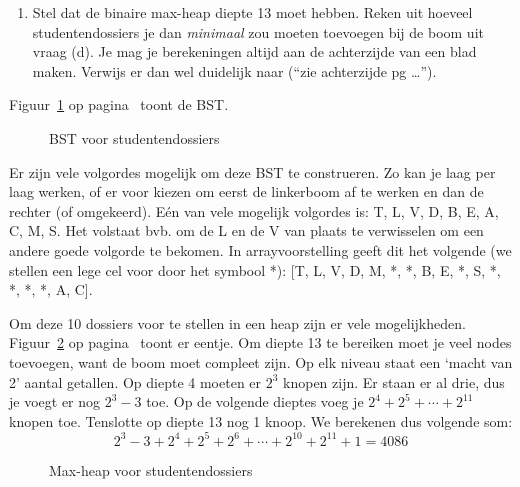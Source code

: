 \begin{oef}
\begin{enumerate}
\item Stel dat de binaire max-heap diepte 13 moet hebben. Reken uit hoeveel studentendossiers je dan \emph{minimaal} zou moeten toevoegen bij de boom uit vraag (d). Je mag je berekeningen altijd aan de achterzijde van een blad maken. Verwijs er dan wel duidelijk naar (“zie achterzijde pg …”).
\end{enumerate}
\begin{opl}
Figuur~\ref{fig:bstexjuni19opl} op pagina~\pageref{fig:bstexjuni19opl} toont de BST.
\begin{figure}[htbp] 
    \centering
{}
\caption{BST voor studentendossiers}
    \label{fig:bstexjuni19opl}
\end{figure}
Er zijn vele volgordes mogelijk om deze BST te construeren. Zo kan je laag per laag werken, of er voor kiezen om eerst de linkerboom af te werken en dan de rechter (of omgekeerd). Eén van vele mogelijk volgordes is: T, L, V, D, B, E, A, C, M, S. Het volstaat bvb. om de L en de V van plaats te verwisselen om een andere goede volgorde te bekomen. In arrayvoorstelling geeft dit het volgende (we stellen een lege cel voor door het symbool *): [T, L, V, D, M, *, *, B, E, *, S, *, *, *, *, A, C].

Om deze 10 dossiers voor te stellen in een heap zijn er vele mogelijkheden. Figuur~\ref{fig:bstexjuni19oplheap} op pagina~\pageref{fig:bstexjuni19oplheap} toont er eentje. Om diepte 13 te bereiken moet je veel nodes toevoegen, want de boom moet compleet zijn. Op elk niveau staat een ‘macht van 2’ aantal getallen. Op diepte 4 moeten er $2^3$ knopen zijn. Er staan er al drie, dus je voegt er nog $2^3 - 3$ toe. Op de volgende dieptes voeg je $2^4 + 2^5 + \cdots + 2^{11}$ knopen toe. Tenslotte op diepte 13 nog 1 knoop. We berekenen dus volgende som: 
\[
2^3 - 3 + 2^4 + 2^5 + 2^6 + \cdots + 2^{10} + 2^{11} + 1 = 4086
\]
\begin{figure}[htbp] 
    \centering
{}
\caption{Max-heap voor studentendossiers}
    \label{fig:bstexjuni19oplheap}
\end{figure}
\end{opl}
\end{oef}

